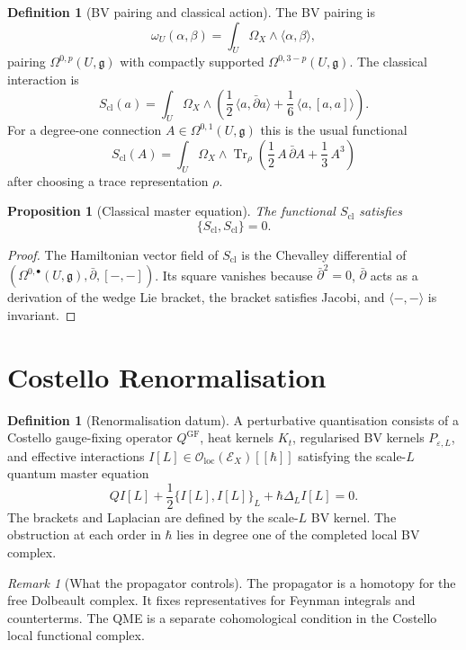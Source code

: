 \documentclass[11pt]{article}
\newtheorem{proposition}[theorem]{Proposition}
\theoremstyle{definition}
\newtheorem{definition}[theorem]{Definition}
\theoremstyle{remark}
\newtheorem{remark}[theorem]{Remark}
\providecommand{\dbar}{\bar{\partial}}
\providecommand{\fg}{\mathfrak{g}}
\providecommand{\Tr}{\operatorname{Tr}}
\providecommand{\cE}{\mathcal{E}}
\providecommand{\cO}{\mathcal{O}}
\begin{document}
\begin{definition}[BV pairing and classical action]
\label{def:bv-action}
The BV pairing is
\[
  \omega_U(\alpha,\beta)
  =
  \int_U\Omega_X\wedge\langle\alpha,\beta\rangle ,
\]
pairing $\Omega^{0,p}(U,\fg)$ with compactly supported
$\Omega^{0,3-p}(U,\fg)$.  The classical interaction is
\[
  S_{\mathrm{cl}}(a)=
  \int_U\Omega_X\wedge
  \left(
    \frac12\,\langle a,\dbar a\rangle
    +\frac16\,\langle a,[a,a]\rangle
  \right).
\]
For a degree-one connection $A\in\Omega^{0,1}(U,\fg)$ this is the usual
functional
\[
  S_{\mathrm{cl}}(A)=
  \int_U\Omega_X\wedge
  \Tr_\rho\!\left(
    \frac12\,A\,\dbar A+\frac13\,A^3
  \right)
\]
after choosing a trace representation $\rho$.
\end{definition}

\begin{proposition}[Classical master equation]
\label{prop:cme}
The functional $S_{\mathrm{cl}}$ satisfies
\[
  \{S_{\mathrm{cl}},S_{\mathrm{cl}}\}=0 .
\]
\end{proposition}

\begin{proof}
The Hamiltonian vector field of $S_{\mathrm{cl}}$ is the Chevalley
differential of
$(\Omega^{0,\bullet}(U,\fg),\dbar,[-,-])$.  Its square vanishes because
$\dbar^2=0$, $\dbar$ acts as a derivation of the wedge Lie bracket,
the bracket satisfies Jacobi, and $\langle-,-\rangle$ is invariant.
\end{proof}

\section{Costello Renormalisation}
\label{sec:costello-renormalisation}

\begin{definition}[Renormalisation datum]
\label{def:renormalisation-datum}
A perturbative quantisation consists of a Costello gauge-fixing
operator $Q^{\mathrm{GF}}$, heat kernels $K_t$, regularised BV kernels
$P_{\varepsilon,L}$, and effective interactions
$I[L]\in\cO_{\mathrm{loc}}(\cE_X)[[\hbar]]$ satisfying the scale-$L$
quantum master equation
\[
  QI[L]+\frac12\{I[L],I[L]\}_{L}
  +\hbar\Delta_{L}I[L]=0 .
\]
The brackets and Laplacian are defined by the scale-$L$ BV kernel.  The
obstruction at each order in $\hbar$ lies in degree one of the completed
local BV complex.
\end{definition}

\begin{remark}[What the propagator controls]
\label{rem:propagator-controls}
The propagator is a homotopy for the free Dolbeault complex.  It fixes
representatives for Feynman integrals and counterterms.  The QME is a
separate cohomological condition in the Costello local functional
complex.
\end{remark}
\end{document}
